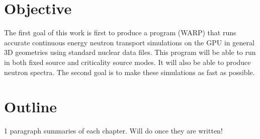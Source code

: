 \section{Objective}

The first goal of this work is first to produce a program (WARP) that runs accurate continuous energy neutron transport simulations on the GPU in general 3D geometries using standard nuclear data files.  This program will be able to run in both fixed source and criticality source modes.  It will also be able to produce neutron spectra.  The second goal is to make these simulations as fast as possible.

\section{Outline}

1 paragraph summaries of each chapter.  Will do once they are written!
